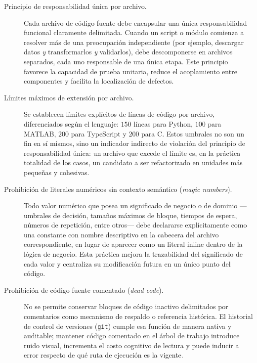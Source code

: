 \begin{description}
    \item[Principio de responsabilidad \'unica por archivo.] Cada archivo de
    c\'odigo fuente debe encapsular una \'unica responsabilidad funcional
    claramente delimitada. Cuando un script o m\'odulo comienza a resolver
    m\'as de una preocupaci\'on independiente (por ejemplo, descargar datos
    \emph{y} transformarlos \emph{y} validarlos), debe descomponerse en
    archivos separados, cada uno responsable de una \'unica etapa. Este
    principio favorece la capacidad de prueba unitaria, reduce el
    acoplamiento entre componentes y facilita la localizaci\'on de defectos.

    \item[L\'imites m\'aximos de extensi\'on por archivo.] Se establecen
    l\'imites expl\'icitos de l\'ineas de c\'odigo por archivo, diferenciados
    seg\'un el lenguaje: $150$ l\'ineas para Python, $100$ para MATLAB, $200$
    para TypeScript y $200$ para C. Estos umbrales no son un fin en s\'i
    mismos, sino un indicador indirecto de violaci\'on del principio de
    responsabilidad \'unica: un archivo que excede el l\'imite es, en la
    pr\'actica totalidad de los casos, un candidato a ser refactorizado en
    unidades m\'as peque\~nas y cohesivas.

    \item[Prohibici\'on de literales num\'ericos sin contexto sem\'antico
    (\emph{magic numbers}).] Todo valor num\'erico que posea un significado
    de negocio o de dominio —umbrales de decisi\'on, tama\~nos m\'aximos de
    bloque, tiempos de espera, n\'umeros de repetici\'on, entre otros— debe
    declararse expl\'icitamente como una constante con nombre descriptivo en
    la cabecera del archivo correspondiente, en lugar de aparecer como un
    literal inline dentro de la l\'ogica de negocio. Esta pr\'actica mejora
    la trazabilidad del significado de cada valor y centraliza su
    modificaci\'on futura en un \'unico punto del c\'odigo.

    \item[Prohibici\'on de c\'odigo fuente comentado (\emph{dead code}).] No
    se permite conservar bloques de c\'odigo inactivo delimitados por
    comentarios como mecanismo de respaldo o referencia hist\'orica. El
    historial de control de versiones (\texttt{git}) cumple esa funci\'on de
    manera nativa y auditable; mantener c\'odigo comentado en el \'arbol de
    trabajo introduce ruido visual, incrementa el costo cognitivo de lectura
    y puede inducir a error respecto de qu\'e ruta de ejecuci\'on es la
    vigente.
\end{description}

